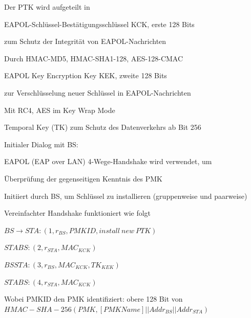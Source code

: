 \documentclass[a4paper]{article}
\begin{document}
\begin{multicols}{3}
\begin{itemize*}
\begin{itemize*}
            \end{itemize*}
            \item Der PTK wird aufgeteilt in
            \begin{description*}
                  \item[EAPOL-Schlüssel-Bestätigungsschlüssel] KCK, erste 128 Bits
                  \begin{itemize*}
                        \item zum Schutz der Integrität von EAPOL-Nachrichten
                        \item Durch HMAC-MD5, HMAC-SHA1-128, AES-128-CMAC
                  \end{itemize*}
                  \item[EAPOL Key Encryption Key] KEK, zweite 128 Bits
                  \begin{itemize*}
                        \item zur Verschlüsselung neuer Schlüssel in EAPOL-Nachrichten
                        \item Mit RC4, AES im Key Wrap Mode
                  \end{itemize*}
                  \item[Temporal Key] (TK) zum Schutz des Datenverkehrs ab Bit 256
            \end{description*}
            \item Initialer Dialog mit BS:
            \begin{itemize*}
                  \item EAPOL (EAP over LAN) 4-Wege-Handshake wird verwendet, um
                  \item Überprüfung der gegenseitigen Kenntnis des PMK
                  \item Initiiert durch BS, um Schlüssel zu installieren (gruppenweise und paarweise)
                  \item Vereinfachter Handshake funktioniert wie folgt
                  \begin{enumerate*}
                        \item $BS\rightarrow STA: (1, r_{BS} , PMKID, install\ new\ PTK)$
                        \item $STA BS: (2, r_{STA}, MAC_{KCK})$
                        \item $BS STA: (3, r_{BS}, MAC_{KCK}, {TK}_{KEK})$
                        \item $STA BS: (4, r_{STA}, MAC_{KCK})$
                  \end{enumerate*}
                  \item Wobei PMKID den PMK identifiziert: obere 128 Bit von $HMAC-SHA-256(PMK,[PMK Name]||Addr_{BS}||Addr_{STA})$
            \end{itemize*}
      \end{itemize*}


\end{multicols}
\end{document}
